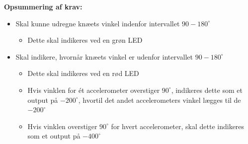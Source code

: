 \vspace{3mm}
\textbf{Opsummering af krav:}
\begin{itemize}
\item[\text{\sffamily \checkmark}] Skal kunne udregne knæets vinkel indenfor intervallet $90-180^{\circ}$
\begin{itemize}
\item Dette skal indikeres ved en grøn LED
\end{itemize}
\item[\text{\sffamily \checkmark}] Skal indikere, hvornår knæets vinkel er udenfor intervallet $90-180^{\circ}$
\begin{itemize}
\item Dette skal indikeres ved en rød LED
\item Hvis vinklen for ét accelerometer overstiger $90^{\circ}$, indikeres dette som et output på $-200^{\circ}$, hvortil det andet accelerometers vinkel lægges til de $-200^{\circ}$
\item Hvis vinklen overstiger $90^{\circ}$ for hvert accelerometer, skal dette indikeres som et output på $-400^{\circ}$
\end{itemize}
\end{itemize}